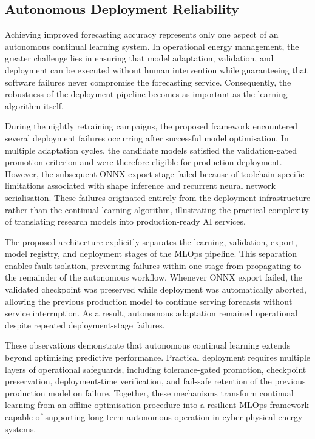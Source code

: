 \documentclass[journal]{IEEEtran}
\begin{document}
\subsection{Autonomous Deployment Reliability}
\label{sec:results_deployment}

Achieving improved forecasting accuracy represents only one aspect of
an autonomous continual learning system. In operational energy
management, the greater challenge lies in ensuring that model
adaptation, validation, and deployment can be executed without human
intervention while guaranteeing that software failures never compromise
the forecasting service. Consequently, the robustness of the deployment
pipeline becomes as important as the learning algorithm itself.

During the nightly retraining campaigns, the proposed framework
encountered several deployment failures occurring after successful model
optimisation. In multiple adaptation cycles, the candidate models
satisfied the validation-gated promotion criterion and were therefore
eligible for production deployment. However, the subsequent ONNX export
stage failed because of toolchain-specific limitations associated with
shape inference and recurrent neural network serialisation. These
failures originated entirely from the deployment infrastructure rather
than the continual learning algorithm, illustrating the practical
complexity of translating research models into production-ready AI
services.

The proposed architecture explicitly separates the learning,
validation, export, model registry, and deployment stages of the MLOps
pipeline. This separation enables fault isolation, preventing failures
within one stage from propagating to the remainder of the autonomous
workflow. Whenever ONNX export failed, the validated checkpoint was
preserved while deployment was automatically aborted, allowing the
previous production model to continue serving forecasts without service
interruption. As a result, autonomous adaptation remained operational
despite repeated deployment-stage failures.

These observations demonstrate that autonomous continual learning
extends beyond optimising predictive performance. Practical deployment
requires multiple layers of operational safeguards, including
tolerance-gated promotion, checkpoint preservation, deployment-time
verification, and fail-safe retention of the previous production model
on failure. Together, these
mechanisms transform continual learning from an offline optimisation
procedure into a resilient MLOps framework capable of supporting
long-term autonomous operation in cyber-physical energy systems.
\end{document}
